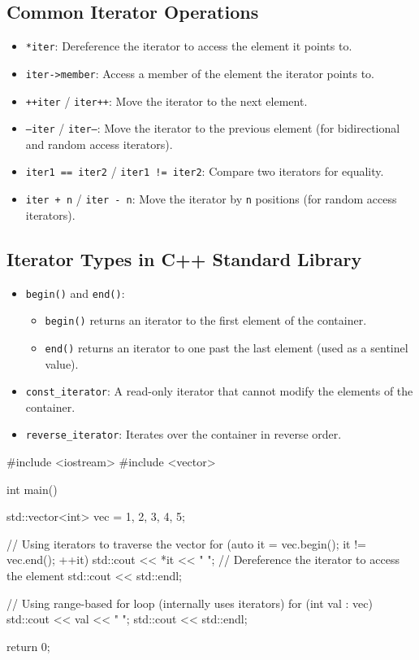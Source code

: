 \subsection*{Common Iterator Operations}
\begin{itemize}
    \item \texttt{*iter}: Dereference the iterator to access the element it points to.
    \item \texttt{iter->member}: Access a member of the element the iterator points to.
    \item \texttt{++iter} / \texttt{iter++}: Move the iterator to the next element.
    \item \texttt{--iter} / \texttt{iter--}: Move the iterator to the previous element (for bidirectional and random access iterators).
    \item \texttt{iter1 == iter2} / \texttt{iter1 != iter2}: Compare two iterators for equality.
    \item \texttt{iter + n} / \texttt{iter - n}: Move the iterator by \texttt{n} positions (for random access iterators).
\end{itemize}

\subsection*{Iterator Types in C++ Standard Library}
\begin{itemize}
    \item \texttt{begin()} and \texttt{end()}:
    \begin{itemize}
        \item \texttt{begin()} returns an iterator to the first element of the container.
        \item \texttt{end()} returns an iterator to one past the last element (used as a sentinel value).
    \end{itemize}
    \item \texttt{const\_iterator}: A read-only iterator that cannot modify the elements of the container.
    \item \texttt{reverse\_iterator}: Iterates over the container in reverse order.
\end{itemize}
\begin{exampleblock}
\begin{codeblock}[language=C++]
#include <iostream>
#include <vector>

int main() {
    std::vector<int> vec = {1, 2, 3, 4, 5};

    // Using iterators to traverse the vector
    for (auto it = vec.begin(); it != vec.end(); ++it) {
        std::cout << *it << " "; // Dereference the iterator to access the element
    }
    std::cout << std::endl;

    // Using range-based for loop (internally uses iterators)
    for (int val : vec) {
        std::cout << val << " ";
    }
    std::cout << std::endl;

    return 0;
}
\end{codeblock}
\end{exampleblock}

